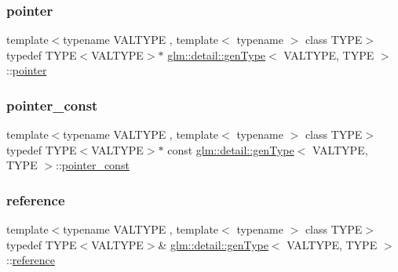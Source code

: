 \mbox{\label{structglm_1_1detail_1_1gen_type_a0b4ddd0af4ae5665c60055e5b622808e}} 
\subsubsection{\texorpdfstring{pointer}{pointer}}
{\footnotesize\ttfamily template$<$typename V\+A\+L\+T\+Y\+PE , template$<$ typename $>$ class T\+Y\+PE$>$ \\
typedef T\+Y\+PE$<$V\+A\+L\+T\+Y\+PE$>$$\ast$ \mbox{\hyperlink{structglm_1_1detail_1_1gen_type}{glm\+::detail\+::gen\+Type}}$<$ V\+A\+L\+T\+Y\+PE, T\+Y\+PE $>$\+::\mbox{\hyperlink{structglm_1_1detail_1_1gen_type_a0b4ddd0af4ae5665c60055e5b622808e}{pointer}}}

\mbox{\label{structglm_1_1detail_1_1gen_type_a4d7745054035d7efed18ec1d7215bbf0}} 
\subsubsection{\texorpdfstring{pointer\+\_\+const}{pointer\_const}}
{\footnotesize\ttfamily template$<$typename V\+A\+L\+T\+Y\+PE , template$<$ typename $>$ class T\+Y\+PE$>$ \\
typedef T\+Y\+PE$<$V\+A\+L\+T\+Y\+PE$>$$\ast$ const \mbox{\hyperlink{structglm_1_1detail_1_1gen_type}{glm\+::detail\+::gen\+Type}}$<$ V\+A\+L\+T\+Y\+PE, T\+Y\+PE $>$\+::\mbox{\hyperlink{structglm_1_1detail_1_1gen_type_a4d7745054035d7efed18ec1d7215bbf0}{pointer\+\_\+const}}}

\mbox{\label{structglm_1_1detail_1_1gen_type_a14792cf03ce9cfb37becd2da5d9ae06a}} 
\subsubsection{\texorpdfstring{reference}{reference}}
{\footnotesize\ttfamily template$<$typename V\+A\+L\+T\+Y\+PE , template$<$ typename $>$ class T\+Y\+PE$>$ \\
typedef T\+Y\+PE$<$V\+A\+L\+T\+Y\+PE$>$\& \mbox{\hyperlink{structglm_1_1detail_1_1gen_type}{glm\+::detail\+::gen\+Type}}$<$ V\+A\+L\+T\+Y\+PE, T\+Y\+PE $>$\+::\mbox{\hyperlink{structglm_1_1detail_1_1gen_type_a14792cf03ce9cfb37becd2da5d9ae06a}{reference}}}

